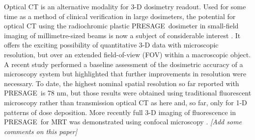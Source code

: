 	Optical CT %
	is an alternative modality for 3-D dosimetry readout. Used for some time as a method of clinical verification in large dosimeters, the potential for optical CT using the radiochromic plastic PRESAGE\textregistered \ dosimeter in small-field imaging of millimetre-sized beams is now a subject of considerable interest \cite{clift2010toward}. %
	It offers the exciting possibility of quantitative 3-D data with microscopic resolution, but over an extended field-of-view (FOV) within a macroscopic object. A recent study \cite{doranestablishing2013} performed a baseline assessment of the dosimetric accuracy of a microscopy system but highlighted that further improvements in resolution were necessary. To date, the highest nominal spatial resolution so far reported with PRESAGE\textregistered  \ is 78 nm, but those results were obtained using traditional fluorescent microscopy \cite{annabellevaluating2012} rather than transmission optical CT as here and, so far, only for 1-D patterns of dose deposition. %
	More recently full 3-D imaging of fluorescence in PRESAGE\textregistered \ for MRT was demonstrated using confocal microscopy \cite{gagliardi2015high}. \textit{[Add some comments on this paper]}
	
	
